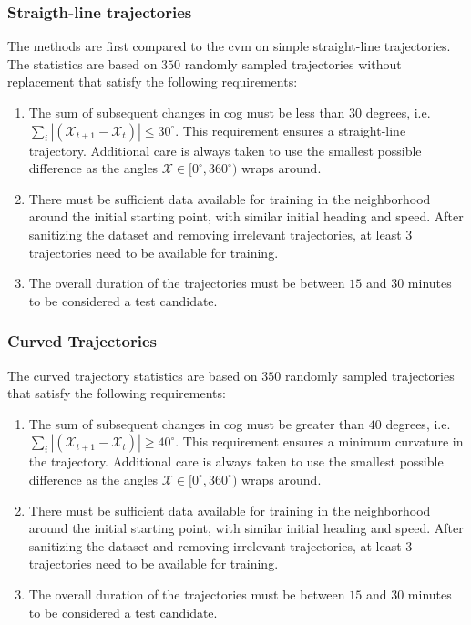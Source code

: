 \subsubsection{Straigth-line trajectories}
The methods are first compared to the \acrshort{cvm} on simple straight-line trajectories. The statistics are based on $350$ randomly sampled trajectories without replacement that satisfy the following requirements:
\begin{enumerate}
    \item The sum of subsequent changes in \acrshort{cog} must be less than $30$ degrees, i.e. $\sum_i |(\mathcal{X}_{t+1} - \mathcal{X}_t)| \leq 30^\circ$. This requirement ensures a straight-line trajectory. Additional care is always taken to use the smallest possible difference as the angles $\mathcal{X} \in [0^\circ, 360^\circ)$ wraps around.
    \item There must be sufficient data available for training in the neighborhood around the initial starting point, with similar initial heading and speed. After sanitizing the dataset and removing irrelevant trajectories, at least $3$ trajectories need to be available for training.
    \item The overall duration of the trajectories must be between $15$ and $30$ minutes to be considered a test candidate.
\end{enumerate}

\subsubsection{Curved Trajectories}
The curved trajectory statistics are based on $350$ randomly sampled trajectories that satisfy the following requirements:
\begin{enumerate}
    \item The sum of subsequent changes in \acrshort{cog} must be greater than $40$ degrees, i.e. $\sum_i |(\mathcal{X}_{t+1} - \mathcal{X}_t)| \geq 40^\circ$. This requirement ensures a minimum curvature in the trajectory. Additional care is always taken to use the smallest possible difference as the angles $\mathcal{X} \in [0^\circ, 360^\circ)$ wraps around.
    \item There must be sufficient data available for training in the neighborhood around the initial starting point, with similar initial heading and speed. After sanitizing the dataset and removing irrelevant trajectories, at least $3$ trajectories need to be available for training.
    \item The overall duration of the trajectories must be between $15$ and $30$ minutes to be considered a test candidate.
\end{enumerate}

